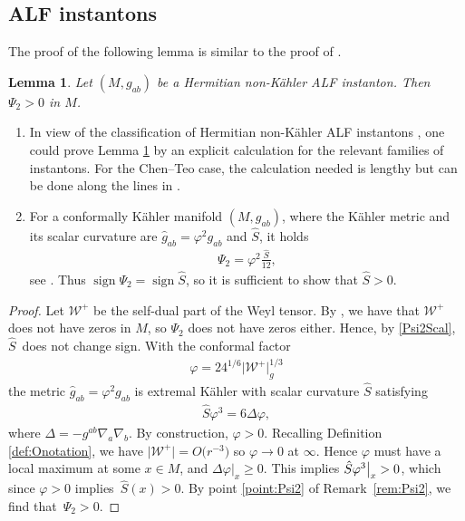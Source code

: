 \documentclass[pdftex]{sigma}
\numberwithin{equation}{section}
\newtheorem{Lemma}[Theorem]{Lemma}
\begin{document}
\subsection{ALF instantons}
The proof of the following lemma is similar to the proof of \cite[Theorem~A]{biquard2023gravitational}.
\begin{Lemma}\label{lem:Psi2}
Let $(M, g_{ab})$ be a Hermitian non-K\"ahler ALF instanton. Then $\Psi_2 > 0$ in $M$.
\end{Lemma}
\begin{Remark}\label{rem:Psi2}\quad
\begin{enumerate}\itemsep=0pt
\item
In view of the classification of Hermitian non-K\"ahler ALF instantons \cite{li2023classification}, one could prove Lemma \ref{lem:Psi2} by an explicit calculation for the relevant families of instantons. For the Chen--Teo case, the calculation needed is lengthy but can be done along the lines in \cite{aksteiner2021gravitational}.
\item \label{point:Psi2}
For a conformally K\"ahler manifold $(M,g_{ab})$, where the K\"ahler metric and its scalar curvature are $\hat{g}_{ab}=\varphi^2 g_{ab}$ and $\hat{S}$, it holds
\begin{align}\label{Psi2Scal}
\Psi_{2}=\varphi^2 \frac{\hat{S}}{12},
\end{align}
see \cite{araneda2023}. Thus $\operatorname{sign}\Psi_2=\operatorname{sign}\hat{S}$, so it is sufficient to show that $\hat{S}>0$.
\end{enumerate}
\end{Remark}
\begin{proof}
Let $\mathcal{W}^+$ be the self-dual part of the Weyl tensor.
By \cite[Proposition~5, p.~420]{MR707181}, we have that $\mathcal{W}^+$ does not have zeros in $M$, so $\Psi_2$ does not have zeros either. Hence, by \eqref{Psi2Scal}, $\hat{S}$~does not change sign.
With the conformal factor
\begin{align}\label{CF}
\varphi = 24^{1/6} \bigl|\mathcal{W}^+\bigr|_g^{1/3}
\end{align}
the metric $\hat g_{ab} = \varphi^2 g_{ab}$ is extremal K\"ahler with scalar curvature $\hat{S}$ satisfying
\begin{align*}
\hat{S} \varphi^3 = 6 \Delta \varphi,
\end{align*}
where $\Delta = -g^{ab} \nabla_a \nabla_b$. By construction, $\varphi > 0$. Recalling Definition \ref{def:Onotation}, we have $\bigl|\mathcal{W}^+\bigr| = O\bigl(r^{-3}\bigr) $ so $\varphi \to 0$ at $\infty$. Hence $\varphi$ must have a local maximum at some $x \in M$, and $\Delta \varphi {|}_{x} \geq 0$. This implies $\hat S \varphi^3 \big{|}_x > 0$, which since $\varphi > 0$ implies~${\hat S(x) > 0}$.
By point \eqref{point:Psi2} of Remark~\ref{rem:Psi2}, we find that~${\Psi_2 > 0}$.
\end{proof}
\end{document}
